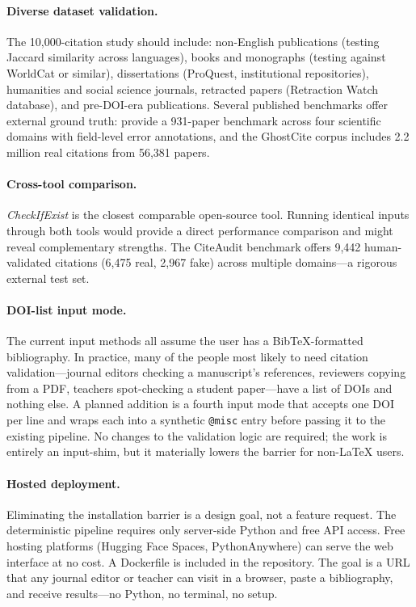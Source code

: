 \paragraph{Diverse dataset validation.} The 10{,}000-citation study should include: non-English publications (testing Jaccard similarity across languages), books and monographs (testing against WorldCat or similar), dissertations (ProQuest, institutional repositories), humanities and social science journals, retracted papers (Retraction Watch database), and pre-DOI-era publications. Several published benchmarks offer external ground truth: \citet{rao2026} provide a 931-paper benchmark across four scientific domains with field-level error annotations, and the GhostCite corpus \citep{ghostcite2026} includes 2.2 million real citations from 56{,}381 papers.

\paragraph{Cross-tool comparison.} \emph{CheckIfExist} \citep{abbonato2026} is the closest comparable open-source tool. Running identical inputs through both tools would provide a direct performance comparison and might reveal complementary strengths. The CiteAudit benchmark \citep{citeaudit2026} offers 9{,}442 human-validated citations (6{,}475 real, 2{,}967 fake) across multiple domains---a rigorous external test set.

\paragraph{DOI-list input mode.} The current input methods all assume the user has a BibTeX-formatted bibliography. In practice, many of the people most likely to need citation validation---journal editors checking a manuscript's references, reviewers copying from a PDF, teachers spot-checking a student paper---have a list of DOIs and nothing else. A planned addition is a fourth input mode that accepts one DOI per line and wraps each into a synthetic \texttt{@misc} entry before passing it to the existing pipeline. No changes to the validation logic are required; the work is entirely an input-shim, but it materially lowers the barrier for non-LaTeX users.

\paragraph{Hosted deployment.} Eliminating the installation barrier is a design goal, not a feature request. The deterministic pipeline requires only server-side Python and free API access. Free hosting platforms (Hugging Face Spaces, PythonAnywhere) can serve the web interface at no cost. A Dockerfile is included in the repository. The goal is a URL that any journal editor or teacher can visit in a browser, paste a bibliography, and receive results---no Python, no terminal, no setup.

